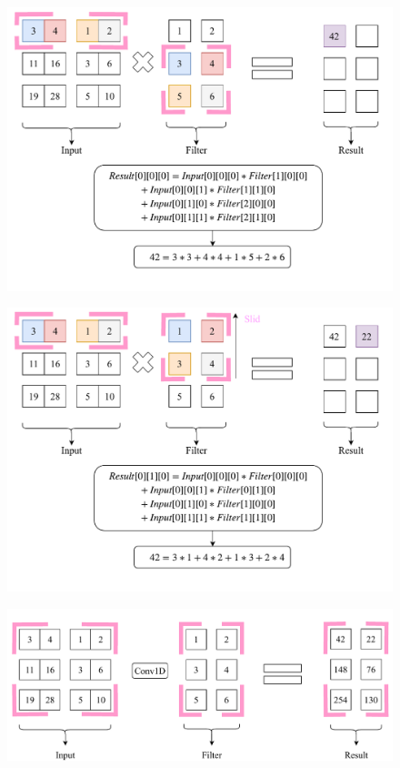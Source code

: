 \documentclass[12pt]{article}
\begin{document}
\begin{figure}[!htbp]
\newpage
\begin{center}
	\includegraphics[width=\textwidth]{secondConvSample_step1}
\end{center}
\end{figure}
\begin{figure}[!htbp]
\begin{center}
	\includegraphics[width=\textwidth]{secondConvSample_step2}
\end{center}
\end{figure}
\begin{figure}[!htbp]
\begin{center}
	\includegraphics[width=\textwidth]{secondConvSample_final}
\end{center}
\end{figure}
\newpage
\end{document}
